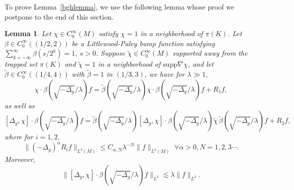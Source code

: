 \documentclass[10pt]{amsart}
\newtheorem{lemma}[theorem]{Lemma}
\newcommand{\la}{\lambda}
\newcommand{\supp}{\mathrm{supp }}
\newcommand{\1}{{\bf 1}}
\begin{document}
To prove Lemma~\ref{bghlemma}, we use the following lemma whose proof we postpone to the end of this section.
\begin{lemma}\label{co}
    Let $\chi\in C_0^\infty(M)$ satisfy $\chi=1$ in a neighborhood of $\pi(K)$. Let $\beta\in C_0^{\infty}((1/2,2))$ be a Littlewood-Paley bump function satisfying $\sum_{k=-\infty}^\infty \beta(s/2^k)=1$,
$s>0$. Suppose $\tilde \chi\in C_0^\infty(M)$ supported away from the trapped set $\pi(K)$ and $\tilde\chi=1$ in a neighborhood of $\supp \nabla\chi$,  and let $\tilde \beta \in C^\infty_0((1/4,4))$ with $\tilde \beta=1$ in $(1/3,3)$, we have for $\la\gg 1$,
\begin{equation}\label{commuteerror}
    \chi \cdot \beta(\sqrt{-\Delta_g}/\la)f = \tilde\beta(\sqrt{-\Delta_g}/\la) \chi \cdot \beta(\sqrt{-\Delta_g}/\la)  f
+R_1f,
\end{equation}
as well as  
\begin{equation}\label{commuteerror1}
    [\Delta_g,\chi] \cdot \beta(\sqrt{-\Delta_g}/\la)f= \tilde\beta(\sqrt{-\Delta_g}/\la)  [\Delta_g,\chi] \cdot \beta(\sqrt{-\Delta_g}/\la)\tilde\chi \,\tilde\beta(\sqrt{-\Delta_g}/\la)  f
+R_2f,
\end{equation}
where for $i=1,2$,
\begin{equation}\label{r}
    \|(-\Delta_g)^{\alpha}R_if\|_{L^2(M)}\le C_{\alpha,N}\la^{-N}\|f\|_{L^2(M)}  \,\,\forall \alpha>0, N=1,2,3\cdots.
\end{equation}
Moreover,
\begin{equation}\label{commuteerror2}
\| [\Delta_g,\chi] \cdot \beta(\sqrt{-\Delta_g}/\la)f\|_{L^2}\lesssim \la\|f\|_{L^2}.
\end{equation}
\end{lemma}
\end{document}
